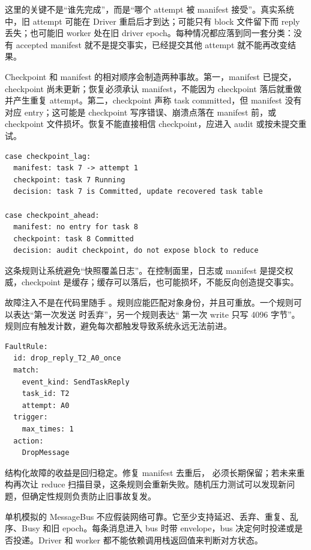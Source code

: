 这里的关键不是“谁先完成”，而是“哪个 attempt 被 manifest 接受”。真实系统中，旧 attempt 可能在 Driver 重启后才到达；可能只有 block 文件留下而 reply 丢失；也可能旧 worker 处在旧 driver epoch。每种情况都应落到同一套分类：没有 accepted manifest 就不是提交事实，已经提交其他 attempt 就不能再改变结果。

Checkpoint 和 manifest 的相对顺序会制造两种事故。第一，manifest 已提交，checkpoint 尚未更新；恢复必须承认 manifest，不能因为 checkpoint 落后就重做并产生重复 attempt。第二，checkpoint 声称 task committed，但 manifest 没有对应 entry；这可能是 checkpoint 写序错误、崩溃点落在 manifest 前，或 checkpoint 文件损坏。恢复不能直接相信 checkpoint，应进入 audit 或按未提交重试。

\begin{lstlisting}[numbers=none,caption={checkpoint 与 manifest 的恢复优先级}]
case checkpoint_lag:
  manifest: task 7 -> attempt 1
  checkpoint: task 7 Running
  decision: task 7 is Committed, update recovered task table

case checkpoint_ahead:
  manifest: no entry for task 8
  checkpoint: task 8 Committed
  decision: audit checkpoint, do not expose block to reduce
\end{lstlisting}

这条规则让系统避免“快照覆盖日志”。在控制面里，日志或 manifest 是提交权威，checkpoint 是缓存；缓存可以落后，也可能损坏，不能反向创造提交事实。

故障注入不是在代码里随手 。规则应能匹配对象身份，并且可重放。一个规则可以表达“第一次发送  时丢弃”，另一个规则表达“ 第一次 write 只写 4096 字节”。规则应有触发计数，避免每次都触发导致系统永远无法前进。

\begin{lstlisting}[numbers=none,caption={故障注入规则的语义形态}]
FaultRule:
  id: drop_reply_T2_A0_once
  match:
    event_kind: SendTaskReply
    task_id: T2
    attempt: A0
  trigger:
    max_times: 1
  action:
    DropMessage
\end{lstlisting}

结构化故障的收益是回归稳定。修复 manifest 去重后， 必须长期保留；若未来重构再次让 reduce 扫描目录，这条规则会重新失败。随机压力测试可以发现新问题，但确定性规则负责防止旧事故复发。

单机模拟的 MessageBus 不应假装网络可靠。它至少支持延迟、丢弃、重复、乱序、Busy 和旧 epoch。每条消息进入 bus 时带 envelope，bus 决定何时投递或是否投递。Driver 和 worker 都不能依赖调用栈返回值来判断对方状态。

